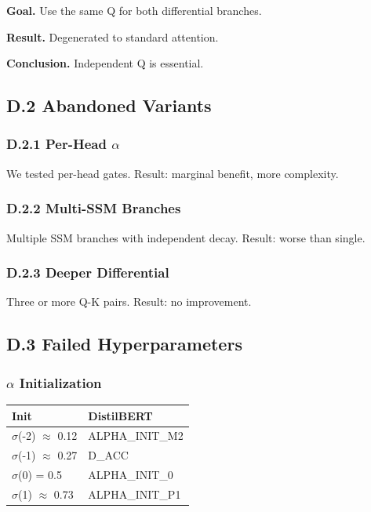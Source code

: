 \textbf{Goal.} Use the same Q for both differential branches.

\textbf{Result.} Degenerated to standard attention.

\textbf{Conclusion.} Independent Q is essential.

\subsection{D.2 Abandoned Variants}

\subsubsection{D.2.1 Per-Head $\alpha$}

We tested per-head gates. Result: marginal benefit, more complexity.

\subsubsection{D.2.2 Multi-SSM Branches}

Multiple SSM branches with independent decay. Result: worse than single.

\subsubsection{D.2.3 Deeper Differential}

Three or more Q-K pairs. Result: no improvement.

\subsection{D.3 Failed Hyperparameters}

\subsubsection{$\alpha$ Initialization}

\begin{table}[H]
\centering
\small
\begin{tabular}{ll}
\toprule
\textbf{Init} & \textbf{DistilBERT} \\
\midrule
$\sigma$(-2) $\approx$ 0.12 & {{ALPHA\_INIT\_M2}} \\
$\sigma$(-1) $\approx$ 0.27 & {{D\_ACC}} \\
$\sigma$(0) = 0.5 & {{ALPHA\_INIT\_0}} \\
$\sigma$(1) $\approx$ 0.73 & {{ALPHA\_INIT\_P1}} \\
\bottomrule
\end{tabular}
\end{table}

